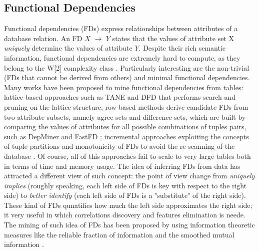 \subsection{Functional Dependencies}\label{fds}
Functional dependencies (FDs) express relationships between attributes of a database relation. An FD $X$ $\rightarrow$ $Y$ states that the values of attribute set X \textit{uniquely} determine the values of attribute $Y$. Despite their rich semantic information, functional dependencies are extremely hard to compute, as they belong to the W[2] complexity class \cite{blasius2017parameterized}. Particularly interesting are the non-trivial (FDs that cannot be derived from others) and minimal functional dependencies. Many works have been proposed to mine functional dependencies from tables: lattice-based approaches such as TANE \cite{huhtala1999tane} and DFD \cite{abedjan2014dfd} that performs search and pruning on the lattice structure; row-based methods derive candidate FDs from two attribute subsets, namely agree sets and difference-sets, which are built by comparing the values of attributes for all possible combinations of tuples pairs, such as DepMiner \cite{lopes2000efficient} and FastFD \cite{wyss2001fastfds}; incremental approaches exploiting the concepts of tuple partitions and monotonicity of FDs to avoid the re-scanning of the database \cite{wang2001incremental}. Of course, all of this approaches fail to scale to very large tables both in terms of time and memory usage. The idea of inferring FDs from data has attracted a different view of such concept: the point of view change from \textit{uniquely implies} (roughly speaking, each left side of FDs is key with respect to the right side) to \textit{better identify} (each left side of FDs is a "substitute" of the right side). These kind of FDs qunatifies how much the left side approximates the right side; it very useful in which correlations discovery and features elimination is neede. The mining of such idea of FDs has been proposed by using information theoretic measures like the reliable fraction of information \cite{mandros2017discovering} and the smoothed mutual information \cite{pennerath2020discovering}.

